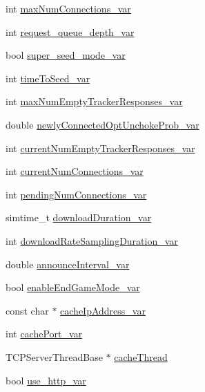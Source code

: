 \begin{DoxyCompactItemize}
int \hyperlink{classBTPeerWireBase_af61e2c3444cf0ff89f3e09e4e4ef0858}{max\+Num\+Connections\+\_\+var}
\item 
int \hyperlink{classBTPeerWireBase_a14f7b2a86b180d25b81cb49669f5cb50}{request\+\_\+queue\+\_\+depth\+\_\+var}
\item 
bool \hyperlink{classBTPeerWireBase_a938d0530b2065918dc19a616848b4a4f}{super\+\_\+seed\+\_\+mode\+\_\+var}
\item 
int \hyperlink{classBTPeerWireBase_aa74a8ae6e2471a3133cf5cfd5975a0f6}{time\+To\+Seed\+\_\+var}
\item 
int \hyperlink{classBTPeerWireBase_a5ecd01e493691d21286ae49c8e5d1d63}{max\+Num\+Empty\+Tracker\+Responses\+\_\+var}
\item 
double \hyperlink{classBTPeerWireBase_acb9f3589a323f2512b50ecfc7cd133ba}{newly\+Connected\+Opt\+Unchoke\+Prob\+\_\+var}
\item 
int \hyperlink{classBTPeerWireBase_a55a4220687e05aa8038a8c9b2619a1df}{current\+Num\+Empty\+Tracker\+Responses\+\_\+var}
\item 
int \hyperlink{classBTPeerWireBase_a3dfe6134d0d722553e9fabed0259bc22}{current\+Num\+Connections\+\_\+var}
\item 
int \hyperlink{classBTPeerWireBase_ae02e259afa6ce80b7ea09ca482a807d8}{pending\+Num\+Connections\+\_\+var}
\item 
simtime\+\_\+t \hyperlink{classBTPeerWireBase_abaebcb4b4c4d9b3680dcdc4a3f74a2b7}{download\+Duration\+\_\+var}
\item 
int \hyperlink{classBTPeerWireBase_a917d38e8848421da2de31b7af5e5fee7}{download\+Rate\+Sampling\+Duration\+\_\+var}
\item 
double \hyperlink{classBTPeerWireBase_a8b2e1655dd0c93ab97938d9dab95d4ce}{announce\+Interval\+\_\+var}
\item 
bool \hyperlink{classBTPeerWireBase_ac02672631f997bf0b445811f97815dee}{enable\+End\+Game\+Mode\+\_\+var}
\item 
const char $\ast$ \hyperlink{classBTPeerWireBase_a27a8fde9f860de7cb0024a6a9409b014}{cache\+Ip\+Address\+\_\+var}
\item 
int \hyperlink{classBTPeerWireBase_aa3bfe78d5613aad46605338c74f8c970}{cache\+Port\+\_\+var}
\item 
T\+C\+P\+Server\+Thread\+Base $\ast$ \hyperlink{classBTPeerWireBase_a82ee3fdd3e35088bed5883fb3e5c7bc6}{cache\+Thread}
\item 
bool \hyperlink{classBTPeerWireBase_ad26a2be1531a341894c3bb2b35ee465e}{use\+\_\+http\+\_\+var}
\item 

\end{DoxyCompactItemize}
